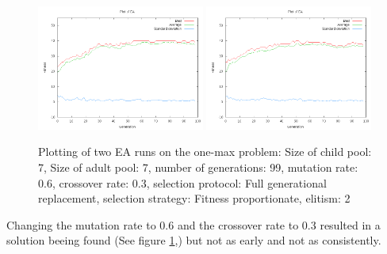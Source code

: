 \documentclass[11pt]{article}
\begin{document}
\begin{figure}[ht]
\begin{center}
\mbox{\includegraphics[width=0.49\textwidth]{images/31.png}}
\mbox{\includegraphics[width=0.49\textwidth]{images/32.png}}
\end{center}
\caption{Plotting of two EA runs on the one-max problem:
Size of child pool: 7,
Size of adult pool: 7,
number of generations: 99,
mutation rate: 0.6,
crossover rate: 0.3,
selection protocol: Full generational replacement,
selection strategy: Fitness proportionate,
elitism: 2}
\label{fig:3}
\end{figure}

Changing the mutation rate to 0.6 and the crossover rate to 0.3 resulted in a solution
beeing found (See figure \ref{fig:3},) but not as early and not as consistently.
\end{document}
